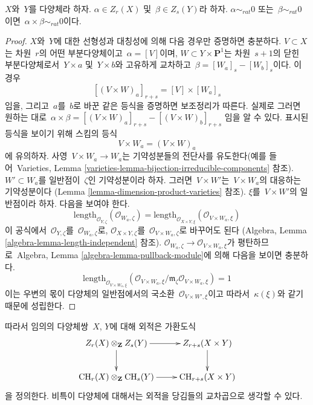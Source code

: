 \begin{lemma}
\label{lemma-exterior-product-rational-equivalence}
$X$와\  $Y$를 다양체라 하자.
$\alpha \in Z_r(X)$ 및\  $\beta \in Z_s(Y)$라 하자.
$\alpha \sim_{rat} 0$ 또는\  $\beta \sim_{rat} 0$이면\ 
$\alpha \times \beta \sim_{rat} 0$이다.
\end{lemma}

\begin{proof}
$X$와\  $Y$에 대한 선형성과 대칭성에 의해 다음 경우만 증명하면 충분하다.
$V \subset X$는 차원\  $r$의 어떤 부분다양체이고\  $\alpha = [V]$이며,
$W \subset Y \times \mathbf{P}^1$는 차원\  $s + 1$의 닫힌 부분다양체로서\ 
$Y \times a$ 및\  $Y \times b$와 고유하게 교차하고\ 
$\beta = [W_a]_s - [W_b]_s$이다. 이 경우
$$
[(V \times W)_a]_{r + s} = [V] \times [W_a]_s
$$
임을, 그리고\  $a$를\  $b$로 바꾼 같은 등식을 증명하면 보조정리가 따른다.
실제로 그러면 원하는 대로\ 
$\alpha \times \beta = [(V \times W)_a]_{r + s} - [(V \times W)_b]_{r + s}$
임을 알 수 있다. 표시된 등식을 보이기 위해 스킴의 등식
$$
V \times W_a = (V \times W)_a
$$
에 유의하자. 사영\  $V \times W_a \to W_a$는 기약성분들의 전단사를
유도한다(예를 들어\  Varieties, Lemma
\ref{varieties-lemma-bijection-irreducible-components} 참조).
$W' \subset W_a$를 일반점이\  $\zeta$인 기약성분이라 하자.
그러면\  $V \times W'$는\  $V \times W_a$의 대응하는 기약성분이다
(Lemma \ref{lemma-dimension-product-varieties} 참조).
$\xi$를\  $V \times W'$의 일반점이라 하자. 다음을 보여야 한다.
$$
\text{length}_{\mathcal{O}_{Y, \zeta}}(\mathcal{O}_{W_a, \zeta}) =
\text{length}_{\mathcal{O}_{X \times Y, \xi}}(
\mathcal{O}_{V \times W_a, \xi})
$$
이 공식에서\  $\mathcal{O}_{Y, \zeta}$를\  $\mathcal{O}_{W_a, \zeta}$로,
$\mathcal{O}_{X \times Y, \zeta}$를\ 
$\mathcal{O}_{V \times W_a, \zeta}$로 바꾸어도 된다
(Algebra, Lemma \ref{algebra-lemma-length-independent} 참조).
$\mathcal{O}_{W_a, \zeta} \to \mathcal{O}_{V \times W_a, \xi}$가
평탄하므로\  Algebra, Lemma \ref{algebra-lemma-pullback-module}에 의해
다음을 보이면 충분하다.
$$
\text{length}_{\mathcal{O}_{V \times W_a, \xi}}(
\mathcal{O}_{V \times W_a, \xi}/
\mathfrak m_\zeta\mathcal{O}_{V \times W_a, \xi}) = 1
$$
이는 우변의 몫이 다양체의 일반점에서의 국소환\ 
$\mathcal{O}_{V \times W', \xi}$이고 따라서\  $\kappa(\xi)$와 같기 때문에
성립한다.
\end{proof}

\noindent
따라서 임의의 다양체쌍\  $X$, $Y$에 대해 외적은 가환도식
$$
\xymatrix{
Z_r(X) \otimes_\mathbf{Z} Z_s(Y) \ar[r] \ar[d] &
Z_{r + s}(X \times Y) \ar[d] \\
\CH_r(X) \otimes_\mathbf{Z} \CH_s(Y) \ar[r] &
\CH_{r + s}(X \times Y)
}
$$
을 정의한다. 비특이 다양체에 대해서는 외적을 당김들의 교차곱으로 생각할
수 있다.

